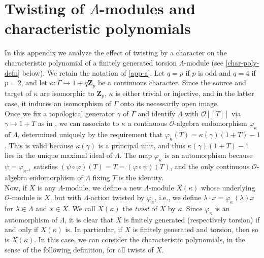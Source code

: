 \documentclass[12 pt]{amsart}
\theoremstyle{plain}
\theoremstyle{definition}
\numberwithin{equation}{section}
\numberwithin{table}{section}
\begin{document}
\section{Twisting of $\Lambda$-modules and characteristic polynomials}
\label{app-b}
\indent In this appendix we analyze the effect of twisting by a character on the characteristic polynomial of a finitely generated torsion $\Lambda$-module (see \cref{char-poly-defn} below). We retain the notation of \cref{app-a}. Let $q=p$ if $p$ is odd and $q=4$ if $p=2$, and let $\kappa:\Gamma\rightarrow 1+q\mathbf{Z}_p$ be a continuous character. Since the source and target of $\kappa$ are isomorphic to $\mathbf{Z}_p$, $\kappa$ is either trivial or injective, and in the latter case, it induces an isomorphism of $\Gamma$ onto its necessarily open image.\\%
\indent Once we fix a topological generator $\gamma$ of $\Gamma$ and identify $\Lambda$ with $\mathscr{O}[[T]]$ via $\gamma\mapsto 1+T$ as in \cite[Proposition 5.3.5]{NSW}, we can associate to $\kappa$ a continuous $\mathscr{O}$-algebra endomorphism $\varphi_\kappa$ of $\Lambda$, determined uniquely by the requirement that $\varphi_\kappa(T)=\kappa(\gamma)(1+T)-1$. This is valid because $\kappa(\gamma)$ is a principal unit, and thus $\kappa(\gamma)(1+T)-1$ lies in the unique maximal ideal of $\Lambda$. The map $\varphi_\kappa$ is an automorphism because $\psi=\varphi_{\kappa^{-1}}$ satisfies $(\psi\circ\varphi)(T)=T=(\varphi\circ\psi)(T)$, and the only continuous $\mathscr{O}$-algebra endomorphism of $\Lambda$ fixing $T$ is the identity.\\%
\indent Now, if $X$ is any $\Lambda$-module, we define a new $\Lambda$-module $X(\kappa)$ whose underlying $\mathscr{O}$-module is $X$, but with $\Lambda$-action twisted by $\varphi_\kappa$, i.e., we define $\lambda\cdot x=\varphi_\kappa(\lambda)x$ for $\lambda\in\Lambda$ and $x\in X$. We call $X(\kappa)$ the \emph{twist} of $X$ by $\kappa$. Since $\varphi_\kappa$ is an automorphism of $\Lambda$, it is clear that $X$ is finitely generated (respectively torsion) if and only if $X(\kappa)$ is. In particular, if $X$ is finitely generated and torsion, then so is $X(\kappa)$. In this case, we can consider the characteristic polynomials, in the sense of the following definition, for all twists of $X$.
\end{document}
